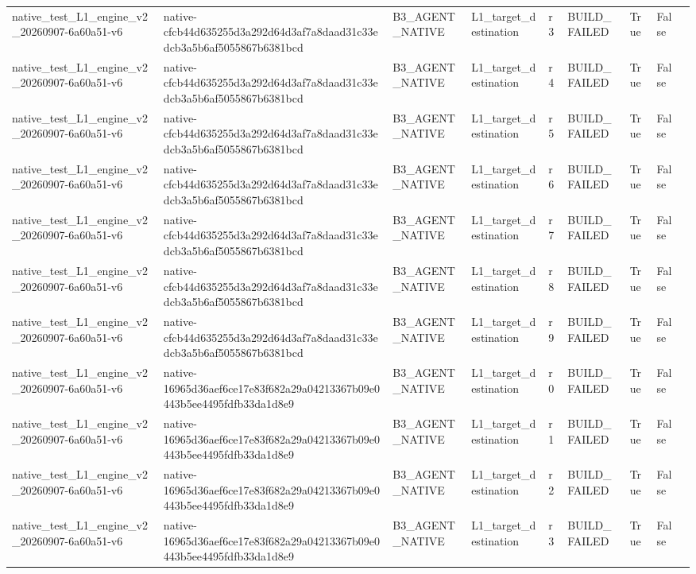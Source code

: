 \begin{tabular}{lllllllll}
native\_test\_L1\_engine\_v2\_20260907-6a60a51-v6 & native-cfcb44d635255d3a292d64d3af7a8daad31c33edcb3a5b6af5055867b6381bcd & B3\_AGENT\_NATIVE & L1\_target\_destination & r3 & BUILD\_FAILED & True & False &  \\
native\_test\_L1\_engine\_v2\_20260907-6a60a51-v6 & native-cfcb44d635255d3a292d64d3af7a8daad31c33edcb3a5b6af5055867b6381bcd & B3\_AGENT\_NATIVE & L1\_target\_destination & r4 & BUILD\_FAILED & True & False &  \\
native\_test\_L1\_engine\_v2\_20260907-6a60a51-v6 & native-cfcb44d635255d3a292d64d3af7a8daad31c33edcb3a5b6af5055867b6381bcd & B3\_AGENT\_NATIVE & L1\_target\_destination & r5 & BUILD\_FAILED & True & False &  \\
native\_test\_L1\_engine\_v2\_20260907-6a60a51-v6 & native-cfcb44d635255d3a292d64d3af7a8daad31c33edcb3a5b6af5055867b6381bcd & B3\_AGENT\_NATIVE & L1\_target\_destination & r6 & BUILD\_FAILED & True & False &  \\
native\_test\_L1\_engine\_v2\_20260907-6a60a51-v6 & native-cfcb44d635255d3a292d64d3af7a8daad31c33edcb3a5b6af5055867b6381bcd & B3\_AGENT\_NATIVE & L1\_target\_destination & r7 & BUILD\_FAILED & True & False &  \\
native\_test\_L1\_engine\_v2\_20260907-6a60a51-v6 & native-cfcb44d635255d3a292d64d3af7a8daad31c33edcb3a5b6af5055867b6381bcd & B3\_AGENT\_NATIVE & L1\_target\_destination & r8 & BUILD\_FAILED & True & False &  \\
native\_test\_L1\_engine\_v2\_20260907-6a60a51-v6 & native-cfcb44d635255d3a292d64d3af7a8daad31c33edcb3a5b6af5055867b6381bcd & B3\_AGENT\_NATIVE & L1\_target\_destination & r9 & BUILD\_FAILED & True & False &  \\
native\_test\_L1\_engine\_v2\_20260907-6a60a51-v6 & native-16965d36aef6ce17e83f682a29a04213367b09e0443b5ee4495fdfb33da1d8e9 & B3\_AGENT\_NATIVE & L1\_target\_destination & r0 & BUILD\_FAILED & True & False &  \\
native\_test\_L1\_engine\_v2\_20260907-6a60a51-v6 & native-16965d36aef6ce17e83f682a29a04213367b09e0443b5ee4495fdfb33da1d8e9 & B3\_AGENT\_NATIVE & L1\_target\_destination & r1 & BUILD\_FAILED & True & False &  \\
native\_test\_L1\_engine\_v2\_20260907-6a60a51-v6 & native-16965d36aef6ce17e83f682a29a04213367b09e0443b5ee4495fdfb33da1d8e9 & B3\_AGENT\_NATIVE & L1\_target\_destination & r2 & BUILD\_FAILED & True & False &  \\
native\_test\_L1\_engine\_v2\_20260907-6a60a51-v6 & native-16965d36aef6ce17e83f682a29a04213367b09e0443b5ee4495fdfb33da1d8e9 & B3\_AGENT\_NATIVE & L1\_target\_destination & r3 & BUILD\_FAILED & True & False &  \\

\end{tabular}
